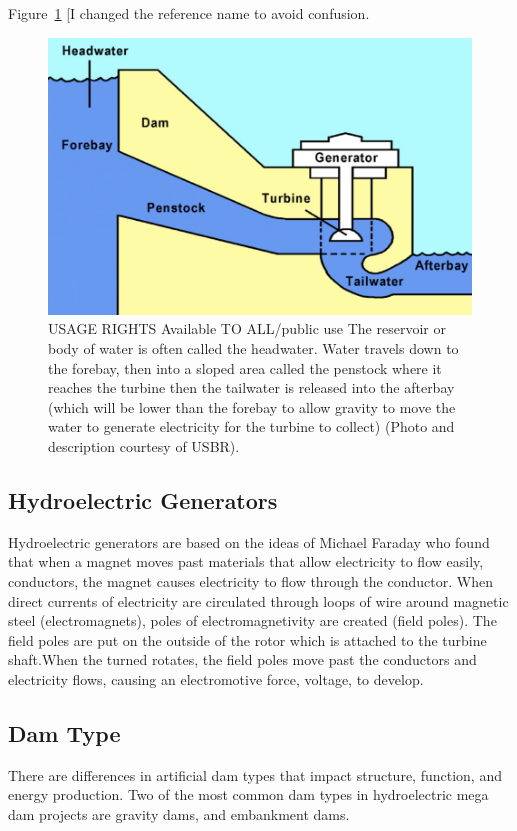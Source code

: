\documentclass{book}\usepackage{knitr}
\begin{document}
\begin{knitrout}
\begin{kframe}
{Figure~\ref{fig:USBR} [I changed the reference name to avoid confusion.

\begin{figure}
\includegraphics[width=\textwidth]{images/diagram.png}
\caption{USAGE RIGHTS Available TO ALL/public use The reservoir or body of water is often called the headwater. Water travels down to the forebay, then into a sloped area called the penstock where it reaches the turbine then the tailwater is released into the afterbay (which will be lower than the forebay to allow gravity to move the water to generate electricity for the turbine to collect) (Photo and description courtesy of USBR).}
\label{fig:USBR}
\end{figure}


\subsection{Hydroelectric Generators}
  Hydroelectric generators are based on the ideas of Michael Faraday who found that when a magnet moves past materials that allow electricity to flow easily, conductors, the magnet causes electricity to flow through the conductor. When direct currents of electricity are circulated through loops of wire around magnetic steel (electromagnets), poles of electromagnetivity are created (field poles). The field poles are put on the outside of the rotor which is attached to the turbine shaft.When the turned rotates, the field poles move past the conductors and electricity flows, causing an electromotive force, voltage, to develop. 
\subsection{Dam Type}
There are differences in artificial dam types that impact structure, function, and energy production. Two of the most common dam types in hydroelectric mega dam projects are gravity dams, and embankment dams. 
}
\end{kframe}
\end{knitrout}
\end{document}
